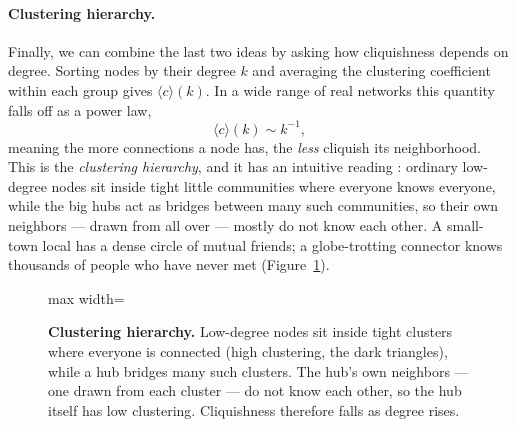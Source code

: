 \paragraph{Clustering hierarchy.}
Finally, we can combine the last two ideas by asking how cliquishness depends on
degree. Sorting nodes by their degree $k$ and averaging the clustering
coefficient within each group gives $\langle c\rangle(k)$. In a wide range of
real networks this quantity falls off as a power law,
\begin{equation}
  \langle c \rangle(k) \sim k^{-1},
  \label{eq:intro-hierarchy}
\end{equation}
meaning the more connections a node has, the \emph{less} cliquish its
neighborhood. This is the \emph{clustering hierarchy}, and it has an intuitive
reading \citep{ravasz2002,ravasz2003}: ordinary low-degree nodes sit inside
tight little communities where everyone knows everyone, while the big hubs act as
bridges between many such communities, so their own neighbors --- drawn from all
over --- mostly do not know each other. A small-town local has a dense circle of
mutual friends; a globe-trotting connector knows thousands of people who have
never met (Figure~\ref{fig:intro-hierarchy}).

\begin{figure}[t]
\centering
\begin{adjustbox}{max width=\linewidth}\end{adjustbox}
\caption{\textbf{Clustering hierarchy.} Low-degree nodes sit inside tight clusters
where everyone is connected (high clustering, the dark triangles), while a hub
bridges many such clusters. The hub's own neighbors --- one drawn from each
cluster --- do not know each other, so the hub itself has low clustering.
Cliquishness therefore falls as degree rises.}
\label{fig:intro-hierarchy}
\end{figure}

